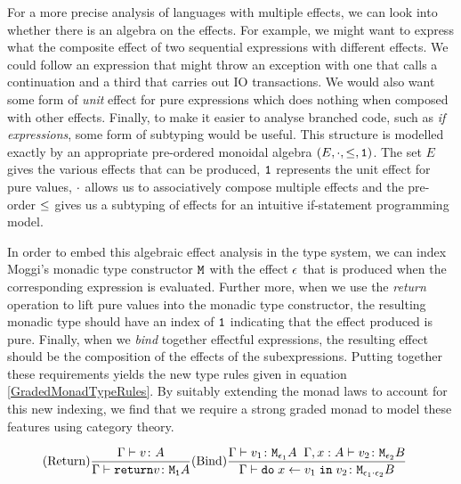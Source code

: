 \documentclass{Report}
\begin{document}
For a more precise analysis of languages with multiple effects, we can look into whether there is an algebra on the effects. For example, we might want to express what the composite effect of two sequential expressions with different effects. We could follow an expression that might throw an exception with one that calls a continuation and a third that carries out IO transactions. We would also want some form of \textit{unit} effect for pure expressions which does nothing when composed with other effects. Finally, to make it easier to analyse branched code, such as \textit{if expressions}, some form of subtyping would be useful. This structure is modelled exactly by an appropriate pre-ordered monoidal algebra $(E, \dot, \subeffect, \1)$. The set $E$ gives the various effects that can be produced, $\1$ represents the unit effect for pure values, $\dot$ allows us to associatively compose multiple effects and the pre-order  $\subeffect$ gives us a subtyping of effects for an intuitive if-statement programming model.

In order to embed this algebraic effect analysis in the type system, we can index Moggi's monadic type constructor $\M{}{}$ with the effect $\e$ that is produced when the corresponding expression is evaluated. Further more, when we use the \textit{return} operation to lift pure values into the monadic type constructor, the resulting monadic type should have an index of $\1$ indicating that the effect produced is pure. Finally, when we \textit{bind} together effectful expressions, the resulting effect should be the composition of the effects of the subexpressions. Putting together these requirements yields the new type rules given in equation \ref{GradedMonadTypeRules}. By suitably extending the monad laws to account for this new indexing, we find that we require a strong graded monad to model these features using category theory.

\begin{eqnarray}\label{GradedMonadTypeRules}
    \treerule{Return}{\typerelation{\G}{v}{A}}{\typerelation{\G}{\return{v}}{\moa}} & \treerule{Bind}{\typerelation{\G}{v_1}{\M{\e_1}{A}} \s\s \typerelation{\gax}{v_2}{\M{\e_2}{B}}}{\typerelation{\G}{\doin{x}{v_1}{v_2}}{\M{\e_1 \dot \e_2}{B}}}
\end{eqnarray}
\end{document}
